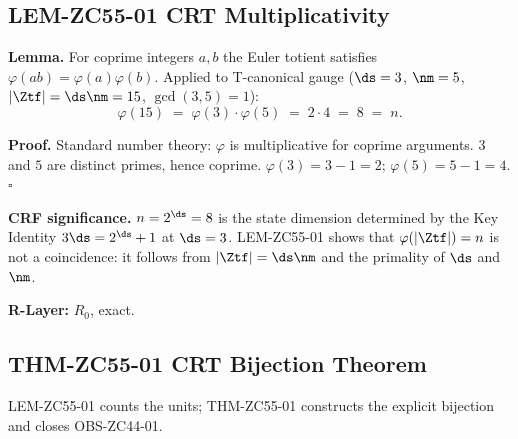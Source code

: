 \documentclass[12pt, a4paper]{article}
\begin{document}
\subsection{LEM-ZC55-01 \quad CRT Multiplicativity}
\label{sec:lem01}


\begin{formalbox}[title={LEM-ZC55-01: Euler Totient Multiplicativity
  at T-canonical Parameters ($R_0$, Exact)}]
\textbf{Lemma.}
For coprime integers $a,b$ the Euler totient satisfies
$\varphi(ab)=\varphi(a)\varphi(b)$.
Applied to T-canonical gauge ($\ds=3$, $\nm=5$,
$|\Ztf|=\ds\nm=15$, $\gcd(3,5)=1$):
\begin{equation}
  \varphi(15) \;=\; \varphi(3)\cdot\varphi(5) \;=\; 2\cdot4 \;=\; 8 \;=\; n.
  \label{eq:totient-mult}
\end{equation}

\textbf{Proof.}
Standard number theory: $\varphi$ is multiplicative for coprime
arguments.  $3$ and $5$ are distinct primes, hence coprime.
$\varphi(3)=3-1=2$; $\varphi(5)=5-1=4$. \hfill$\square$

\medskip
\textbf{CRF significance.}
$n=2^{\ds}=8$ is the state dimension determined by the Key Identity
$3\ds=2^{\ds}+1$ at $\ds=3$.  LEM-ZC55-01 shows that
$\varphi(|\Ztf|)=n$ is not a coincidence: it follows from
$|\Ztf|=\ds\nm$ and the primality of $\ds$ and~$\nm$.

\textbf{R-Layer:} $R_0$, exact.
\end{formalbox}

\subsection{THM-ZC55-01 \quad CRT Bijection Theorem}
\label{sec:thm01}

LEM-ZC55-01 counts the units; THM-ZC55-01 constructs the explicit
bijection and closes OBS-ZC44-01.

\end{document}
